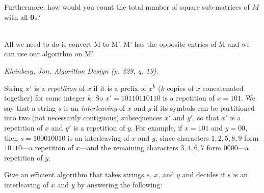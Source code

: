 \documentclass[solutionorbox,answers]{exam}
\begin{document}
\begin{questions}
\begin{parts}
  \item Furthermore, how would you count the total number of square sub-matrices of $M$ with all \textbf{0}s?
  \begin{solutionbox}{} \vspace{1em}\\ 
  All we need to do is convert M to M'. M' has the opposite entries of M and we can use our algorithm on M'.
  \end{solutionbox}
  \end{parts}
\newpage



\question \textit{Kleinberg, Jon. Algorithm Design (p. 329, q. 19).} 

String $x'$ is a \emph{repetition} of $x$ if it is a prefix of $x^k$ ($k$ copies of $x$ concatenated
together) for some integer $k$. So $x' = 10110110110$ is a repetition of $x = 101$.
We say that a string $s$ is an \textit{interleaving} of $x$ and $y$ if its symbols can be partitioned into two (not necessarily contiguous) subsequences $x'$ and $y'$, so that $x'$ is a repetition of $x$ and $y'$ is a repetition of $y$. 
For example, if $x = 101$ and $y = 00$,
then $s = 100010010$ is an interleaving of $x$ and $y$, since characters $1,2,5,8,9$ form $10110$—a repetition of $x$—and the remaining characters $3,4,6,7$ form
$0000$—a repetition of $y$.

Give an efficient algorithm that takes strings $s$, $x$, and $y$ and decides if $s$ is an interleaving of $x$ and $y$ by answering the following:


\end{questions}
\end{document}
